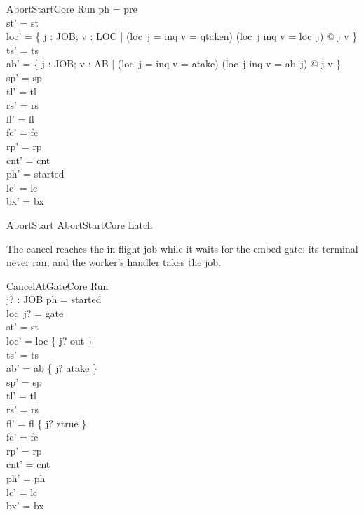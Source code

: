 \documentclass[a4paper,10pt,fleqn]{article}
\begin{document}
\begin{schema}{AbortStartCore}
\Delta Run
\where
ph = pre \\
st' = st \\
loc' = \{ j : JOB; v : LOC | (loc~j = inq \land v = qtaken) \lor (loc~j \neq inq \land v = loc~j) @ j \mapsto v \} \\
ts' = ts \\
ab' = \{ j : JOB; v : AB | (loc~j = inq \land v = atake) \lor (loc~j \neq inq \land v = ab~j) @ j \mapsto v \} \\
sp' = sp \\
tl' = tl \\
rs' = rs \\
fl' = fl \\
fc' = fc \\
rp' = rp \\
cnt' = cnt \\
ph' = started \\
lc' = lc \\
bx' = bx
\end{schema}

\begin{zed}
AbortStart  AbortStartCore \land Latch
\end{zed}

The cancel reaches the in-flight job while it waits for the embed gate: its
terminal never ran, and the worker's handler takes the job.

\begin{schema}{CancelAtGateCore}
\Delta Run \\ j? : JOB
\where
ph = started \\
loc~j? = gate \\
st' = st \\
loc' = loc \oplus \{ j? \mapsto out \} \\
ts' = ts \\
ab' = ab \oplus \{ j? \mapsto atake \} \\
sp' = sp \\
tl' = tl \\
rs' = rs \\
fl' = fl \oplus \{ j? \mapsto ztrue \} \\
fc' = fc \\
rp' = rp \\
cnt' = cnt \\
ph' = ph \\
lc' = lc \\
bx' = bx
\end{schema}
\end{document}
